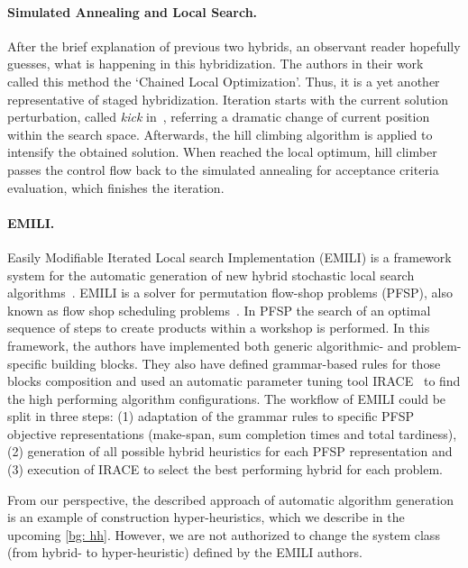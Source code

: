 \paragraph{Simulated Annealing and Local Search.}
After the brief explanation of previous two hybrids, an observant reader hopefully guesses, what is happening in this hybridization.
The authors in their work~\cite{martin1996combining} called this method the `Chained Local Optimization'. Thus, it is a yet another representative of staged hybridization.
Iteration starts with the current solution perturbation, called \emph{kick} in~\cite{martin1996combining}, referring a dramatic change of current position within the search space. Afterwards, the hill climbing algorithm is applied to intensify the obtained solution. When reached the local optimum, hill climber passes the control flow back to the simulated annealing for acceptance criteria evaluation, which finishes the iteration.

\paragraph{EMILI.}
Easily Modifiable Iterated Local search Implementation (EMILI) is a framework system for the automatic generation of new hybrid stochastic local search algorithms~\cite{pagnozzi2019automatic}. EMILI is a solver for permutation flow-shop problems (PFSP), also known as flow shop scheduling problems~\cite{reza2005flowshop}. In PFSP the search of an optimal sequence of steps to create products within a workshop is performed.
In this framework, the authors have implemented both generic algorithmic- and problem-specific building blocks. They also have defined grammar-based rules for those blocks composition and used an automatic parameter tuning tool IRACE~\cite{lopez2016irace} to find the high performing algorithm configurations. The workflow of EMILI could be split in three steps: (1) adaptation of the grammar rules to specific PFSP objective representations (make-span, sum completion times and total tardiness), (2) generation of all possible hybrid heuristics for each PFSP representation and (3) execution of IRACE to select the best performing hybrid for each problem. 

From our perspective, the described approach of automatic algorithm generation is an example of construction hyper-heuristics, which we describe in the upcoming \cref{bg: hh}. However, we are not authorized to change the system class (from hybrid- to hyper-heuristic) defined by the EMILI authors.

